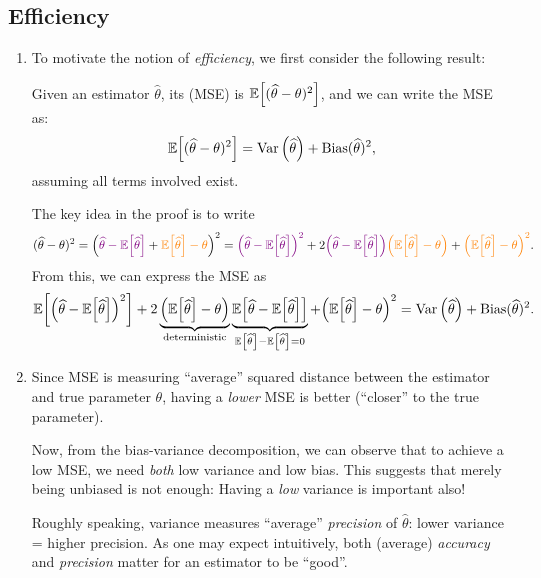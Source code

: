 \subsection{Efficiency}
\begin{enumerate}
\item To motivate the notion of \emph{efficiency}, we first consider the
following result:
\begin{proposition}
\label{prp:bias-var-decomp}
Given an estimator \(\widehat{\theta}\), its  (MSE) is
\(\mathbb{E}\qty[(\widehat{\theta}-\theta)^{2}]\), and we can write the MSE as:
\[
\mathbb{E}\qty[(\widehat{\theta}-\theta)^{2}]=\operatorname{Var}\qty(\widehat{\theta})+\operatorname{Bias}(\widehat{\theta})^2,
\]
assuming all terms involved exist.
\end{proposition}
\begin{pf}
The key idea in the proof is to write
\[
(\widehat{\theta}-\theta)^{2}
=\qty({\color{violet}\widehat{\theta}-\mathbb{E}\qty[\widehat{\theta}]}+{\color{orange}\mathbb{E}\qty[\widehat{\theta}]-\theta})^{2}
={\color{violet}\qty(\widehat{\theta}-\mathbb{E}\qty[\widehat{\theta}])^2}
+2{\color{violet}\qty(\widehat{\theta}-\mathbb{E}\qty[\widehat{\theta}])}
{\color{orange}\qty(\mathbb{E}\qty[\widehat{\theta}]-\theta)}
+{\color{orange}\qty(\mathbb{E}\qty[\widehat{\theta}]-\theta)^2}.
\]
From this, we can express the MSE as
\[
\mathbb{E}\qty[\qty(\widehat{\theta}-\mathbb{E}\qty[\widehat{\theta}])^2]
+2\underbrace{\qty(\mathbb{E}\qty[\widehat{\theta}]-\theta)}_{\text{deterministic}}\underbrace{\mathbb{E}\qty[\widehat{\theta}-\mathbb{E}\qty[\widehat{\theta}]]}_{\mathbb{E}\qty[\widehat{\theta}]-\mathbb{E}\qty[\widehat{\theta}]=0}
+\qty(\mathbb{E}\qty[\widehat{\theta}]-\theta)^2
=\operatorname{Var}\qty(\widehat{\theta})+\operatorname{Bias}(\widehat{\theta})^2.
\]
\end{pf}
\item Since MSE is measuring ``average'' squared distance between the
estimator and true parameter \(\theta\), having a \emph{lower} MSE is better
(``closer'' to the true parameter).

Now, from the bias-variance decomposition, we can observe that to achieve a
low MSE, we need \emph{both} low variance and low bias. This suggests that
merely being unbiased is not enough: Having a \emph{low} variance is important
also!

\begin{note}
Roughly speaking, variance measures ``average'' \emph{precision} of \(\widehat{\theta}\):
lower variance = higher precision. As one may expect intuitively, both
(average) \emph{accuracy} and \emph{precision} matter for an estimator to be
``good''.
\end{note}


\end{enumerate}
